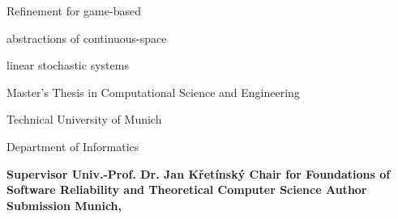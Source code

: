 \startalignment[flushright]
    \dontleavehmode
\stopalignment

\blank[25mm]

{ \CoverTitleFont
    \strut Refinement for game-based\blank[4mm]
    \strut abstractions of continuous-space \blank[4mm]
    \strut linear stochastic systems
}

\blank[100mm]

Master's Thesis in Computational Science and Engineering

Technical University of Munich

Department of Informatics

\blank[20mm]

\starttable[s0|lp(35mm)|lp(115mm)|]
    \NC \bf Supervisor \NC Univ.-Prof. Dr. Jan Křetínský \NC \AR
    \NC \NC Chair for Foundations of Software Reliability and 
    Theoretical Computer Science \NC \AR
    \SR
    \NC \bf Author \NC \Author \NC \AR
    \SR
    \NC \bf Submission \NC Munich, \DateOfCompletion \NC \AR
\stoptable

